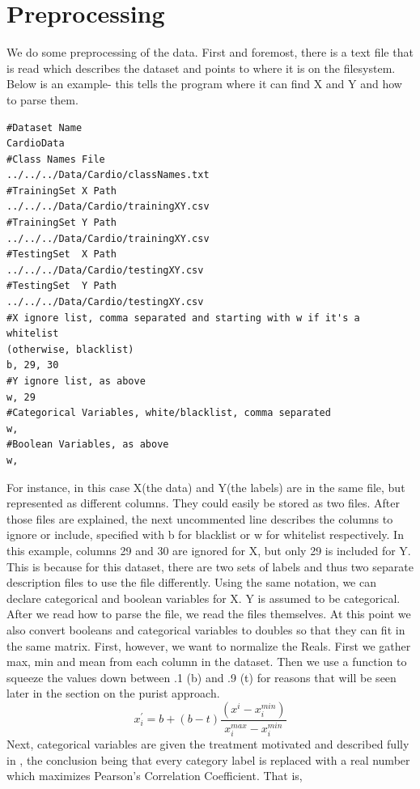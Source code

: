\section{Preprocessing}
We do some preprocessing of the data.  First and foremost, there is a text file
that is read which describes the dataset and points to where it is on the
filesystem.  Below is an example- this tells the program where it can find X and
Y and how to parse them.\pagebreak
\begin{lstlisting}[language=config]
#Dataset Name
CardioData
#Class Names File
../../../Data/Cardio/classNames.txt
#TrainingSet X Path
../../../Data/Cardio/trainingXY.csv
#TrainingSet Y Path
../../../Data/Cardio/trainingXY.csv
#TestingSet  X Path
../../../Data/Cardio/testingXY.csv
#TestingSet  Y Path
../../../Data/Cardio/testingXY.csv
#X ignore list, comma separated and starting with w if it's a whitelist
(otherwise, blacklist)
b, 29, 30
#Y ignore list, as above
w, 29
#Categorical Variables, white/blacklist, comma separated
w, 
#Boolean Variables, as above
w, 
\end{lstlisting}
For instance, in this case X(the data) and Y(the labels) are in the same file,
but represented as different columns.  They could easily be stored as two files.
After those files are explained, the next uncommented line describes the
columns to ignore or include, specified with b for blacklist or w for whitelist
respectively.  In this example, columns 29 and 30 are ignored for X, but only 29
is included for Y.  This is because for this dataset, there are two sets of
labels and thus two separate description files to use the file differently. 
Using the same notation, we can declare categorical and boolean variables for X.
Y is assumed to be categorical.\\
After we read how to parse the file, we read the files themselves.  At this
point we also convert booleans and categorical variables to doubles so that they
can fit in the same matrix.  First, however, we want to normalize the Reals. 
First we gather max, min and mean from each column in the dataset.  Then we use
a function to squeeze the values down between .1 (b) and .9 (t) for reasons that
will be seen later in the section on the purist approach.  
$$x_i^{\prime} = b+(b-t)\frac{(x^i-x_i^{min})}{x_i^{max}-x_i^{min}}$$ Next,
categorical variables are given the treatment motivated and described fully in
\cite{zhang_visual_2015}, the conclusion being that every category label is
replaced with a real number which maximizes Pearson's Correlation Coefficient. 
That is,
